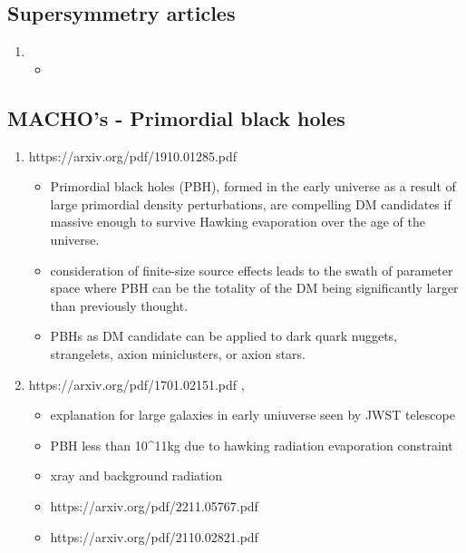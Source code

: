 \documentclass{article}
\begin{document}
\subsection{Supersymmetry articles}
\begin{enumerate}
    \item
    \begin{itemize}
    \item  
    \end{itemize}
\end{enumerate}

\subsection{MACHO's - Primordial black holes}
\begin{enumerate}
    \item https://arxiv.org/pdf/1910.01285.pdf
    \begin{itemize}
    \item  Primordial black holes (PBH), formed in the early universe as a result of large primordial density perturbations, are compelling DM candidates if massive enough to survive Hawking evaporation over the age of the universe.
    \item consideration of finite-size source effects leads to the swath of parameter space where PBH can be the totality of the DM being significantly larger than previously thought.
    \item PBHs as DM candidate can be applied to dark quark nuggets, strangelets, axion miniclusters, or axion stars. 
    \end{itemize}
    \item https://arxiv.org/pdf/1701.02151.pdf , 
    \begin{itemize}
    \item explanation for large galaxies in early uniuverse seen by JWST telescope
    \item PBH less than 10^11kg due to hawking radiation evaporation constraint 
    \item xray and background radiation 
    \item https://arxiv.org/pdf/2211.05767.pdf 
    \item https://arxiv.org/pdf/2110.02821.pdf
    \end{itemize}
\end{enumerate}
\end{document}
